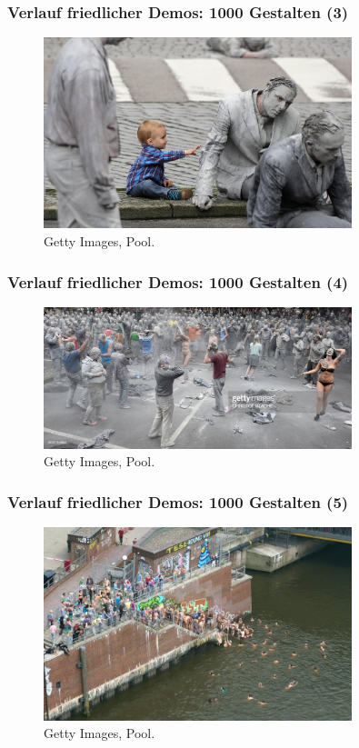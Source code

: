 \documentclass[]{beamer}
\begin{document}
	\begin{frame}
	\frametitle{Verlauf friedlicher Demos: 1000 Gestalten (3)}
	\begin{figure}
		\renewcommand{\figurename}{Foto} 
		\includegraphics[width=0.8\textwidth]{images/1000-gestalten-3}
		\caption{Getty Images, Pool.}
	\end{figure}
\end{frame}

	\begin{frame}
	\frametitle{Verlauf friedlicher Demos: 1000 Gestalten (4)}
	\begin{figure}
		\renewcommand{\figurename}{Foto} 
		\includegraphics[width=0.8\textwidth]{images/1000-gestalten-4}
		\caption{Getty Images, Pool.}
	\end{figure}
\end{frame}

	\begin{frame}
	\frametitle{Verlauf friedlicher Demos: 1000 Gestalten (5)}
	\begin{figure}
		\renewcommand{\figurename}{Foto} 
		\includegraphics[width=0.8\textwidth]{images/1000-gestalten-5}
		\caption{Getty Images, Pool.}
	\end{figure}
\end{frame}
\end{document}
